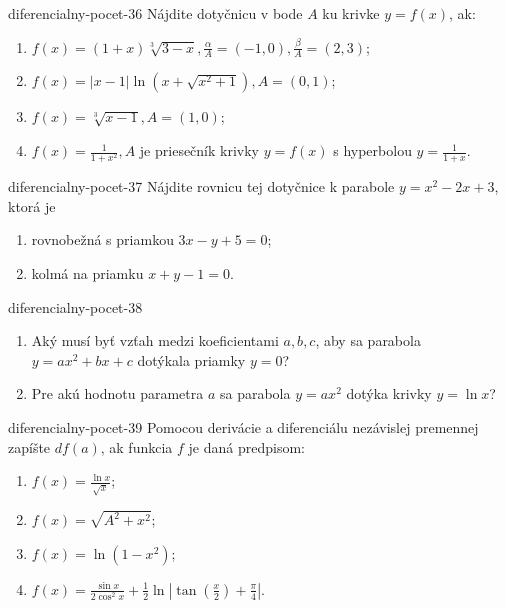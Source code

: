 \begin{defproblem}{diferencialny-pocet-36}
Nájdite dotyčnicu v bode $A$ ku krivke $y=f(x)$, ak:
\begin{enumerate}
\item $f(x)=(1+x)\sqrt[3]{3-x},\frac{\alpha}{A}=(-1,0),\frac{\beta}{A}=(2,3)$;
\item $f(x)=|x-1|\ln (x+\sqrt{x^2+1}),A=(0,1)$;
\item $f(x)=\sqrt[3]{x-1},A=(1,0)$;
\item $f(x)=\frac{1}{1+x^2},A$ je priesečník krivky $y=f(x)$ s hyperbolou $y=\frac{1}{1+x}$.
\end{enumerate}
\end{defproblem}

\begin{defproblem}{diferencialny-pocet-37}
Nájdite rovnicu tej dotyčnice k parabole $y=x^2-2x+3$, ktorá je
\begin{enumerate}
\item rovnobežná s priamkou $3x-y+5=0$;
\item kolmá na priamku $x+y-1=0$.
\end{enumerate}
\end{defproblem}

\begin{defproblem}{diferencialny-pocet-38}
\begin{enumerate}
\item Aký musí byť vzťah medzi koeficientami $a,b,c$, aby sa parabola $y=ax^2+bx+c$ dotýkala priamky $y=0$?
\item Pre akú hodnotu parametra $a$ sa parabola $y=ax^2$ dotýka krivky $y=\ln x$?
\end{enumerate}
\end{defproblem}

\begin{defproblem}{diferencialny-pocet-39}
Pomocou derivácie a diferenciálu nezávislej premennej zapíšte $df(a)$, ak funkcia $f$ je daná predpisom:
\begin{multicols}{2}
\begin{enumerate}
    \item $f(x)=\frac{\ln x}{\sqrt{x}}$;
    \item $f(x)=\sqrt{A^2+x^2}$;
    \item $f(x)=\ln (1-x^2)$;
    \item $f(x)=\frac{\sin x}{2\cos^2 x}+\frac{1}{2}\ln |\tan (\frac{x}{2})+\frac{\pi}{4}|$.
\end{enumerate}
\end{multicols}
\end{defproblem}

